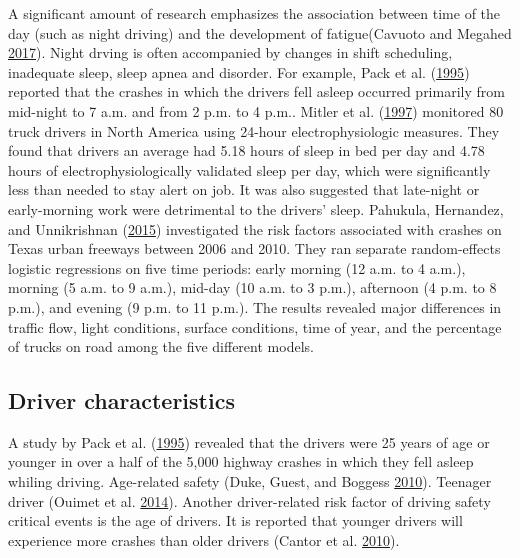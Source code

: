 \documentclass[12pt]{book}
\numberwithin{equation}{chapter}
\begin{document}
A significant amount of research emphasizes the association between time of the day (such as night driving) and the development of fatigue(Cavuoto and Megahed \protect\hyperlink{ref-cavuoto2017understanding}{2017}). Night drving is often accompanied by changes in shift scheduling, inadequate sleep, sleep apnea and disorder. For example, Pack et al. (\protect\hyperlink{ref-pack1995characteristics}{1995}) reported that the crashes in which the drivers fell asleep occurred primarily from mid-night to 7 a.m. and from 2 p.m. to 4 p.m.. Mitler et al. (\protect\hyperlink{ref-mitler1997sleep}{1997}) monitored 80 truck drivers in North America using 24-hour electrophysiologic measures. They found that drivers an average had 5.18 hours of sleep in bed per day and 4.78 hours of electrophysiologically validated sleep per day, which were significantly less than needed to stay alert on job. It was also suggested that late-night or early-morning work were detrimental to the drivers' sleep. Pahukula, Hernandez, and Unnikrishnan (\protect\hyperlink{ref-pahukula2015time}{2015}) investigated the risk factors associated with crashes on Texas urban freeways between 2006 and 2010. They ran separate random-effects logistic regressions on five time periods: early morning (12 a.m. to 4 a.m.), morning (5 a.m. to 9 a.m.), mid-day (10 a.m. to 3 p.m.), afternoon (4 p.m. to 8 p.m.), and evening (9 p.m. to 11 p.m.). The results revealed major differences in traffic flow, light conditions, surface conditions, time of year, and the percentage of trucks on road among the five different models.

\hypertarget{driver-characteristics}{%
\subsection{Driver characteristics}\label{driver-characteristics}}

A study by Pack et al. (\protect\hyperlink{ref-pack1995characteristics}{1995}) revealed that the drivers were 25 years of age or younger in over a half of the 5,000 highway crashes in which they fell asleep whiling driving. Age-related safety (Duke, Guest, and Boggess \protect\hyperlink{ref-duke2010age}{2010}). Teenager driver (Ouimet et al. \protect\hyperlink{ref-ouimet2014higher}{2014}). Another driver-related risk factor of driving safety critical events is the age of drivers. It is reported that younger drivers will experience more crashes than older drivers (Cantor et al. \protect\hyperlink{ref-cantor2010driver}{2010}).
\end{document}
